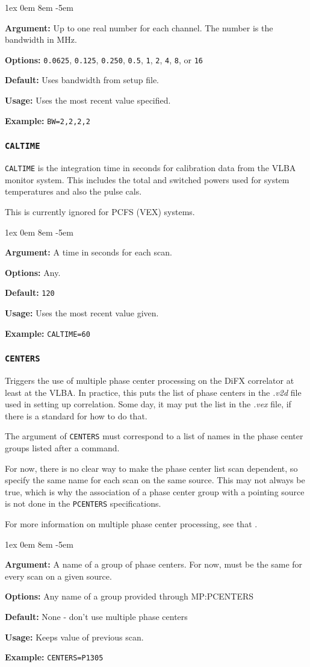 \documentclass{report}
\newcommand{\rcwbox}[5]{
  \begin{list}{}{\parsep 1ex  \itemsep 0em
                 \leftmargin 8em  \itemindent -5em }
    \item {\bf Argument:} #1
    \item {\bf Options:}  #2
    \item {\bf Default:}  #3
    \item {\bf Usage:}    #4
    \item {\bf Example:}  #5
  \end{list}
}
\begin{document}
\rcwbox
{Up to one real number for each channel.  The number is the bandwidth
in MHz.}
{{\tt 0.0625}, {\tt 0.125}, {\tt 0.250}, {\tt 0.5}, {\tt 1},
{\tt 2}, {\tt 4}, {\tt 8}, or {\tt 16}}
{Uses bandwidth from setup file.}
{Uses the most recent value specified.}
{{\tt BW=2,2,2,2}}

\subsubsection{\label{MP:CALTIME}{\tt CALTIME}}

{\tt CALTIME} is the integration time in seconds for calibration
data from the VLBA monitor system. This includes the total and
switched powers used for system temperatures and also the pulse
cals.

This is currently ignored for PCFS (VEX) systems.

\rcwbox
{A time in seconds for each scan.}
{Any.}
{{\tt 120}}
{Uses the most recent value given.}
{{\tt CALTIME=60}}


\subsubsection{\label{MP:CENTERS}{\tt CENTERS}}

Triggers the use of multiple phase center processing on the
DiFX correlator at least at the VLBA.  In practice, this puts
the list of phase centers in the {\sl .v2d} file used in
setting up correlation.  Some day, it may put the list in
the {\sl .vex} file, if there is a standard for how to do that.

The argument of {\tt CENTERS} must correspond to a list of
names in the phase center groups listed after a
 command.

For now, there is no clear way to make the phase center list
scan dependent, so specify the same name for each scan on the
same source.  This may not always be true, which is why the
association of a phase center group with a pointing
source is not done in the {\tt PCENTERS} specifications.

For more information on multiple phase center processing, see
that .

\rcwbox
{A name of a group of phase centers.  For now, must be the
same for every scan on a given source.}
{Any name of a group provided through \htmlref{{\tt PCENTERS}}
{MP:PCENTERS}}
{None - don't use multiple phase centers}
{Keeps value of previous scan.}
{\tt CENTERS=P1305}
\end{document}

